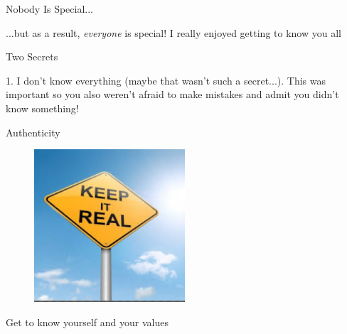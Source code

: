 \documentclass{beamer}
\begin{document}
\begin{frame}{Nobody Is Special...}

...but as a result, {\em everyone} is special!  I really enjoyed getting to know you all

\end{frame}

\begin{frame}{Two Secrets}

1. I don't know everything (maybe that wasn't such a secret...).  This was important so you also weren't afraid to make mistakes and admit you didn't know something!


\end{frame}

\begin{frame}{Authenticity}

\begin{figure}[t]
    \includegraphics[width=0.5\textwidth]{keepitreal.png}
\end{figure}

Get to know yourself and your values

\end{frame}
\end{document}
